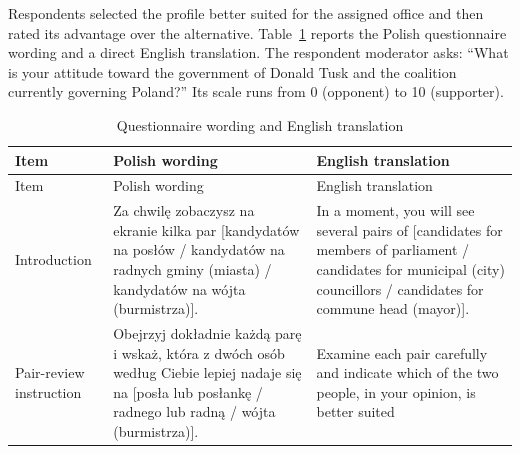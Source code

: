 \documentclass[
  letterpaper,
  DIV=11,
  numbers=noendperiod]{scrartcl}
\begin{document}
Respondents selected the profile better suited for the assigned office
and then rated its advantage over the alternative.
Table~\ref{tbl-task-wording} reports the Polish questionnaire wording
and a direct English translation. The respondent moderator asks: ``What
is your attitude toward the government of Donald Tusk and the coalition
currently governing Poland?'' Its scale runs from 0 (opponent) to 10
(supporter).

\begin{longtable}[]{@{}
  >{\raggedright\arraybackslash}p{}
  >{\raggedright\arraybackslash}p{}
  >{\raggedright\arraybackslash}p{}@{}}
\caption{Questionnaire wording and English
translation}\label{tbl-task-wording}\tabularnewline
\toprule\noalign{}
\begin{minipage}[b]{\linewidth}\raggedright
Item
\end{minipage} & \begin{minipage}[b]{\linewidth}\raggedright
Polish wording
\end{minipage} & \begin{minipage}[b]{\linewidth}\raggedright
English translation
\end{minipage} \\
\midrule\noalign{}
\endfirsthead
\toprule\noalign{}
\begin{minipage}[b]{\linewidth}\raggedright
Item
\end{minipage} & \begin{minipage}[b]{\linewidth}\raggedright
Polish wording
\end{minipage} & \begin{minipage}[b]{\linewidth}\raggedright
English translation
\end{minipage} \\
\midrule\noalign{}
\endhead
\bottomrule\noalign{}
\endlastfoot
Introduction & Za chwilę zobaczysz na ekranie kilka par {[}kandydatów na
posłów / kandydatów na radnych gminy (miasta) / kandydatów na wójta
(burmistrza){]}. & In a moment, you will see several pairs of
{[}candidates for members of parliament / candidates for municipal
(city) councillors / candidates for commune head (mayor){]}. \\
Pair-review instruction & Obejrzyj dokładnie każdą parę i wskaż, która z
dwóch osób według Ciebie lepiej nadaje się na {[}posła lub posłankę /
radnego lub radną / wójta (burmistrza){]}. & Examine each pair carefully
and indicate which of the two people, in your opinion, is better suited

\end{longtable}
\end{document}
